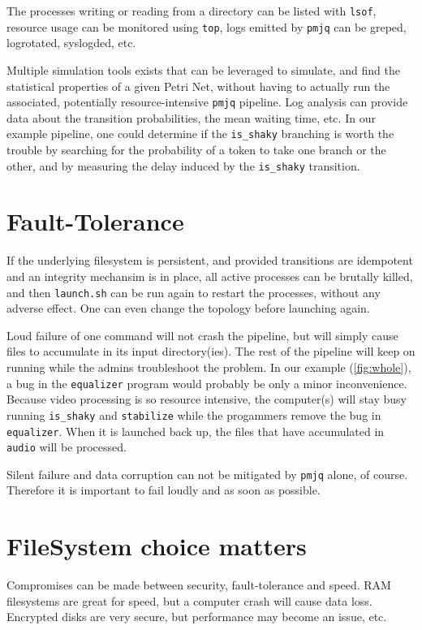 \documentclass[letterpaper,twocolumn,10pt]{article}
\begin{document}
The processes writing or reading from a directory can be listed with {\tt lsof}, resource usage can be monitored using {\tt top}, logs emitted by {\tt pmjq} can be greped, logrotated, syslogded, etc.

Multiple simulation tools exists that can be leveraged to simulate, and find the statistical properties of a given Petri Net, without having to actually run the associated, potentially resource-intensive {\tt pmjq} pipeline. Log analysis can provide data about the transition probabilities, the mean waiting time, etc. In our example pipeline, one could determine if the {\tt is\_shaky} branching is worth the trouble by searching for the probability of a token to take one branch or the other, and by measuring the delay induced by the {\tt is\_shaky} transition.

\section{Fault-Tolerance}

If the underlying filesystem is persistent, and provided transitions are idempotent and an integrity mechansim is in place, all active processes can be brutally killed, and then {\tt launch.sh} can be run again to restart the processes, without any adverse effect. One can even change the topology before launching again.

Loud failure of one command will not crash the pipeline, but will simply cause files to accumulate in its input directory(ies). The rest of the pipeline will keep on running while the admins troubleshoot the problem. In our example (\autoref{fig:whole}), a bug in the {\tt equalizer} program would probably be only a minor inconvenience. Because video processing is so resource intensive, the computer(s) will stay busy running {\tt is\_shaky} and {\tt stabilize} while the progammers remove the bug in {\tt equalizer}. When it is launched back up, the files that have accumulated in {\tt audio} will be processed.

Silent failure and data corruption can not be mitigated by {\tt pmjq} alone, of course. Therefore it is important to fail loudly and as soon as possible.

\section{FileSystem choice matters}
Compromises can be made between security, fault-tolerance and speed. RAM filesystems are great for speed, but a computer crash will cause data loss. Encrypted disks are very secure, but performance may become an issue, etc.
\end{document}
